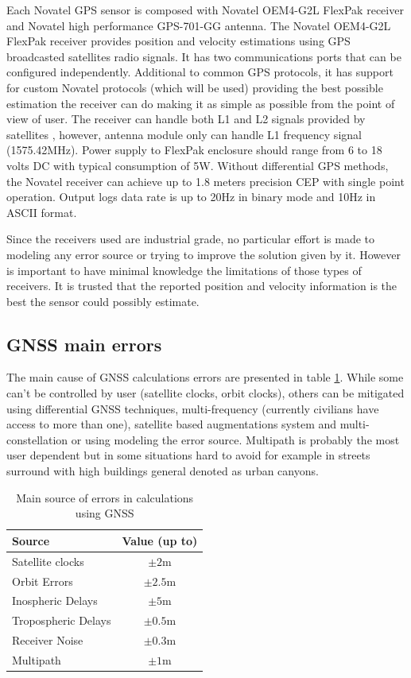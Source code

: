 Each  Novatel GPS sensor is composed with Novatel OEM4-G2L FlexPak receiver and
Novatel high performance GPS-701-GG antenna. The Novatel OEM4-G2L FlexPak
receiver provides position and velocity estimations using GPS broadcasted
satellites radio signals. It has two communications ports that can be configured
independently. Additional to common GPS protocols, it has support for custom
Novatel protocols (which will be used) providing the best possible estimation
the receiver can do making it as simple as possible from the point of view of
user. The receiver can handle both L1 and L2 signals provided by satellites
\cite{NovAtel2005_volume1}, however, antenna module only can handle L1 frequency
signal (1575.42MHz)\cite{NovAtel2013_antenna}. Power supply to FlexPak enclosure
should range from 6 to 18 volts DC with typical consumption of 5W. Without
differential GPS methods, the Novatel receiver can achieve up to 1.8 meters
precision \gls{CEP} with single point operation. Output logs data rate is up to
20Hz in binary mode and 10Hz in ASCII format.

Since the receivers used are industrial grade, no particular effort is made to modeling any error source or trying to improve the solution given by it. However is important to have minimal knowledge the limitations of those types of receivers. It is trusted that the reported position and velocity information is the best the sensor could possibly estimate.

\subsection{GNSS main errors}\label{subsection:GNSS_main_errors}

The main cause of \gls{GNSS} calculations errors are presented in table \ref{tab:gnss_error_source}.
While some can't be controlled by user (satellite clocks, orbit clocks), others can be mitigated using differential GNSS techniques, multi-frequency (currently civilians have access to more than one), satellite based augmentations system and multi-constellation or using modeling the error source. Multipath is probably the most user dependent but in some situations hard to avoid for example in streets surround with high buildings general denoted as urban canyons.


\begin{table}[!htb]
	\centering
	\begin{tabular}{lc}
		\toprule
		\textbf{Source}		& \textbf{Value (up to)}\\
		\midrule
		Satellite clocks	& $\pm2$m\\
		Orbit Errors		& $\pm2.5$m\\
		Inospheric Delays	& $\pm5$m\\
		Tropospheric Delays & $\pm0.5$m\\
		Receiver Noise		& $\pm0.3$m\\
		Multipath			& $\pm1$m\\
		\bottomrule
	\end{tabular}
	\caption[Main source of errors in calculations using GNSS]{Main source of errors in calculations using GNSS \cite{NovatelIntroGNSS}}
	\label{tab:gnss_error_source}
\end{table}
\vfill

